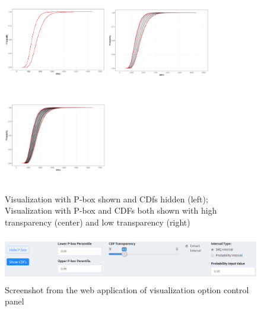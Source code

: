 \documentclass[11pt]{asaproc}\usepackage[]{graphicx}\usepackage[]{color}
\begin{document}
\begin{figure}[t]
\begin{center} 
\includegraphics[height=4.2cm,width=4.5cm]{figures2/pbx_only.png}
\includegraphics[height=4.1cm,width=4.5cm]{figures2/pbx_cdf_d.png}
\includegraphics[height=4.1cm,width=4.5cm]{figures2/pbx_cdf_l.png} 
\end{center} 
\caption{\label{viz_opt}Visualization with P-box shown and CDfs hidden (left); Visualization with P-box and CDFs both shown with high transparency (center) and low transparency (right)}
\end{figure}


\begin{figure}[t]
\begin{center} 
\includegraphics[height=2cm,width=14cm]{figures2/tab_vo.png}
\end{center} 
\caption{\label{tab_vo}Screenshot from the web application of visualization option control panel}
\end{figure}
\end{document}
